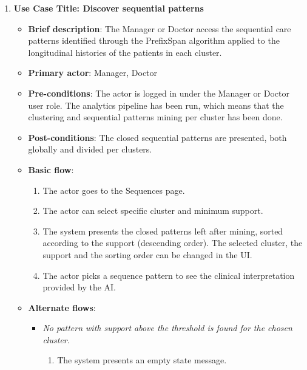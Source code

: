 \begin{enumerate}
\vspace{0.5em}

\item \textbf{Use Case Title: Discover sequential patterns}
\begin{itemize}
    \item \textbf{Brief description}: The Manager or Doctor access the sequential care patterns identified through the PrefixSpan algorithm applied to the longitudinal histories of the patients in each cluster.
    \item \textbf{Primary actor}: Manager, Doctor
    \item \textbf{Pre-conditions}: The actor is logged in under the Manager or Doctor user role. The analytics pipeline has been run, which means that the clustering and sequential patterns mining per cluster has been done.
    \item \textbf{Post-conditions}: The closed sequential patterns are presented, both globally and divided per clusters.
    \item \textbf{Basic flow}:
    \begin{enumerate}
        \item The actor goes to the Sequences page.
        \item The actor can select specific cluster and minimum support.
        \item The system presents the closed patterns left after mining, sorted according to the support (descending order). The selected cluster, the support and the sorting order can be changed in the UI.
        \item The actor picks a sequence pattern to see the clinical interpretation provided by the AI.
    \end{enumerate}
    \item \textbf{Alternate flows}:
    \begin{itemize}
        \item[3a.] \textit{No pattern with support above the threshold is found for the chosen cluster.}
        \begin{enumerate}
            \item The system presents an empty state message.
        \end{enumerate}
    \end{itemize}
\end{itemize}

\vspace{0.5em}


\end{enumerate}
